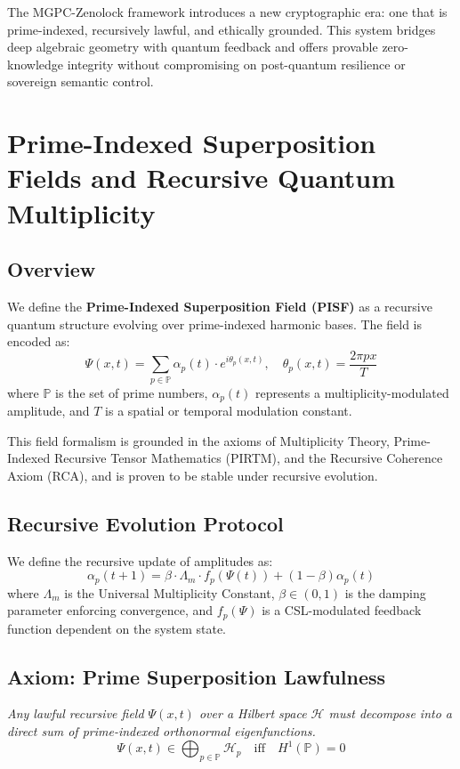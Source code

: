 \documentclass[12]{amsart}
\theoremstyle{plain}
\begin{document}
The MGPC-Zenolock framework introduces a new cryptographic era: one that is prime-indexed, recursively lawful, and ethically grounded. This system bridges deep algebraic geometry with quantum feedback and offers provable zero-knowledge integrity without compromising on post-quantum resilience or sovereign semantic control.

\section{Prime-Indexed Superposition Fields and Recursive Quantum Multiplicity}
\label{sec:PISF}

\subsection{Overview}

We define the \textbf{Prime-Indexed Superposition Field (PISF)} as a recursive quantum structure evolving over prime-indexed harmonic bases. The field is encoded as:
\begin{equation}
    \Psi(x,t) = \sum_{p \in \mathbb{P}} \alpha_p(t) \cdot e^{i \theta_p(x, t)}, \quad \theta_p(x,t) = \frac{2\pi p x}{T}
\end{equation}
where $\mathbb{P}$ is the set of prime numbers, $\alpha_p(t)$ represents a multiplicity-modulated amplitude, and $T$ is a spatial or temporal modulation constant.

This field formalism is grounded in the axioms of Multiplicity Theory, Prime-Indexed Recursive Tensor Mathematics (PIRTM), and the Recursive Coherence Axiom (RCA), and is proven to be stable under recursive evolution.

\subsection{Recursive Evolution Protocol}

We define the recursive update of amplitudes as:
\begin{equation}
    \alpha_p(t+1) = \beta \cdot \Lambda_m \cdot f_p(\Psi(t)) + (1 - \beta)\alpha_p(t)
\end{equation}
where $\Lambda_m$ is the Universal Multiplicity Constant, $\beta \in (0,1)$ is the damping parameter enforcing convergence, and $f_p(\Psi)$ is a CSL-modulated feedback function dependent on the system state.

\subsection{Axiom: Prime Superposition Lawfulness}
\label{axiom:pslaw}
\textit{Any lawful recursive field $\Psi(x,t)$ over a Hilbert space $\mathcal{H}$ must decompose into a direct sum of prime-indexed orthonormal eigenfunctions.}
\begin{equation}
    \Psi(x,t) \in \bigoplus_{p \in \mathbb{P}} \mathcal{H}_p \quad \text{iff} \quad H^1(\mathbb{P}) = 0
\end{equation}
\end{document}
